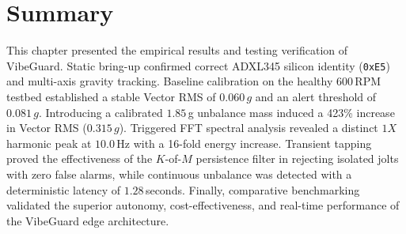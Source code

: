 \section{Summary}
This chapter presented the empirical results and testing verification of VibeGuard. Static bring-up confirmed correct ADXL345 silicon identity (\texttt{0xE5}) and multi-axis gravity tracking. Baseline calibration on the healthy 600\,RPM testbed established a stable Vector RMS of $0.060\,g$ and an alert threshold of $0.081\,g$. Introducing a calibrated $1.85$\,g unbalance mass induced a 423\% increase in Vector RMS ($0.315\,g$). Triggered FFT spectral analysis revealed a distinct $1X$ harmonic peak at $10.0$\,Hz with a 16-fold energy increase. Transient tapping proved the effectiveness of the $K$-of-$M$ persistence filter in rejecting isolated jolts with zero false alarms, while continuous unbalance was detected with a deterministic latency of $1.28$\,seconds. Finally, comparative benchmarking validated the superior autonomy, cost-effectiveness, and real-time performance of the VibeGuard edge architecture.
